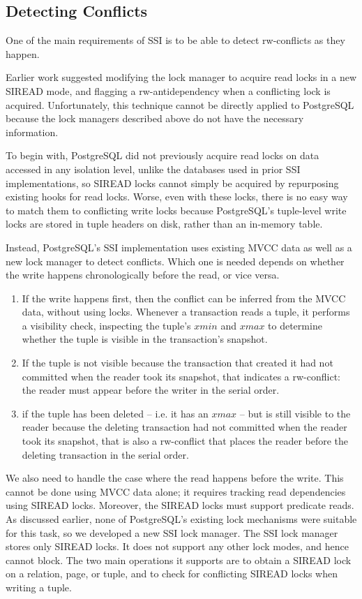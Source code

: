 \documentclass[11pt]{article}
\begin{document}
\subsection{Detecting Conflicts}
\label{sec:orgcdeb049}
One of the main requirements of SSI is to be able to detect rw-conflicts as they happen.

Earlier work suggested modifying the lock manager to acquire read locks in a new SIREAD mode, and
flagging a rw-antidependency when a conflicting lock is acquired. Unfortunately, this technique cannot
be directly applied to PostgreSQL because the lock managers described above do not have the necessary
information.

To begin with, PostgreSQL did not previously acquire read locks on data accessed in any isolation
level, unlike the databases used in prior SSI implementations, so SIREAD locks cannot simply be
acquired by repurposing existing hooks for read locks. Worse, even with these locks, there is no easy
way to match them to conflicting write locks because PostgreSQL’s tuple-level write locks are stored
in tuple headers on disk, rather than an in-memory table.

Instead, PostgreSQL’s SSI implementation uses existing MVCC data as well as a new lock manager to
detect conflicts. Which one is needed depends on whether the write happens chronologically before the
read, or vice versa.
\begin{enumerate}
\item If the write happens first, then the conflict can be inferred from the MVCC data, without using
locks. Whenever a transaction reads a tuple, it performs a visibility check, inspecting the tuple’s
\(xmin\) and \(xmax\) to determine whether the tuple is visible in the transaction’s snapshot.
\item If the tuple is not visible because the transaction that created it had not committed when the
reader took its snapshot, that indicates a rw-conflict: the reader must appear before the writer in
the serial order.
\item if the tuple has been deleted – i.e. it has an \(xmax\) – but is still visible to the reader
because the deleting transaction had not committed when the reader took its snapshot, that is also
a rw-conflict that places the reader before the deleting transaction in the serial order.
\end{enumerate}

We also need to handle the case where the read happens before the write. This cannot be done using
MVCC data alone; it requires tracking read dependencies using SIREAD locks. Moreover, the SIREAD locks
must support predicate reads. As discussed earlier, none of PostgreSQL’s existing lock mechanisms were
suitable for this task, so we developed a new SSI lock manager. The SSI lock manager stores only
SIREAD locks. It does not support any other lock modes, and hence cannot block. The two main
operations it supports are to obtain a SIREAD lock on a relation, page, or tuple, and to check for
conflicting SIREAD locks when writing a tuple.
\end{document}

